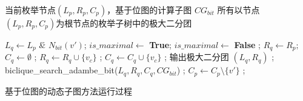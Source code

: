 \begin{algorithm} [H]
  \begin{algorithmic}[1]
    \normalsize
    \REQUIRE 当前枚举节点$(L_p, R_p, C_p)$，基于位图的计算子图 $CG_{bit}$
    \ENSURE 所有以节点$(L_p, R_p, C_p)$为根节点的枚举子树中的极大二分团


    \renewcommand{\algorithmicwhile}{\textbf{procedure}}
    \renewcommand{\algorithmicdo}{\textbf{:}}
    
      \STATE $L_q \leftarrow L_p$ \h{\&} $N_{bit}(v')$;
      \STATE $is\_maximal \leftarrow$ \textbf{True};
          \STATE $is\_maximal \leftarrow$ \textbf{False} ;
        \ENDIF
      \ENDFOR
        \STATE $R_q \leftarrow R_p;$ $C_q \leftarrow \emptyset$ ;
            \STATE $R_q \leftarrow R_q \cup \{v_c\}$ ;
            \STATE $C_q \leftarrow C_q \cup \{v_c\}$ ;
          \ENDIF
        \ENDFOR
        \STATE 输出极大二分团 $(L_q, R_q)$ ;
        \STATE \textsf{biclique\_search\_adambe\_bit}($L_q, R_q, C_q, CG_{bit}$) ;
      \ENDIF
      \STATE $C_p \leftarrow C_p \setminus \{v'\} $ ;
    \ENDFOR
    \ENDWHILE

  \end{algorithmic}
  \caption{基于位图的动态子图方法运行过程}
  \label{alg:adambe_bit}
\end{algorithm}


